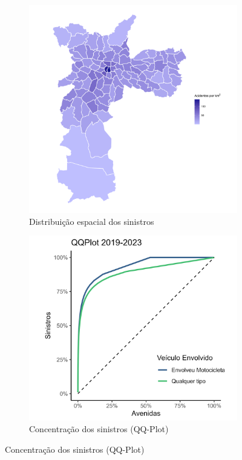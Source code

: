 \begin{figure}[h]
    \caption{Perfil geográfico dos sinistros no município de São Paulo}
    \begin{subfigure}[t]{0.45\linewidth}
        \centering
        \includegraphics[width = 0.9\linewidth]{relatorios/faixa-azul/figuras/mapa_bairros.png}
        \caption{Distribuição espacial dos sinistros}
        \label{fig:mapa}
    \end{subfigure}
    \hfill
    \begin{subfigure}[t]{0.45\linewidth}
        \centering
        \includegraphics[width = 0.9\linewidth]{relatorios/faixa-azul/figuras/qqplot.png}
        \caption{Concentração dos sinistros (QQ-Plot)}
        \label{fig:qqplot}
    \end{subfigure}
\end{figure}

